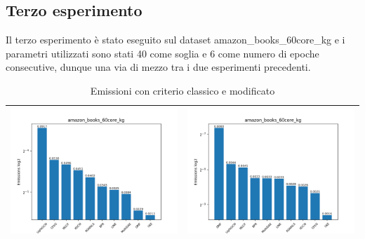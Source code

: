 \subsection{Terzo esperimento}


Il terzo esperimento è stato eseguito sul dataset amazon\_books\_60core\_kg e i parametri utilizzati sono stati 40 come soglia e 6 come numero di epoche consecutive, dunque una via di mezzo tra i due esperimenti precedenti.

\begin{table}[H]
    \centering
    \footnotesize
    \setlength\tabcolsep{0pt}
    \begin{tabularx}{\textwidth}{|X|X|}
        \hline
        \includegraphics[width=\linewidth, trim=0 0 0 0]{images/emissions_amazon_books_60core_kg_earlyClassic.png} &
        \includegraphics[width=\linewidth, trim=0 0 0 0]{images/emissions_amazon_books_60core_kg_earlyModified.png} \\
        \hline
    \end{tabularx}
    \caption{Emissioni con criterio classico e modificato}
    \label{tab:emissions_info}
\end{table}



